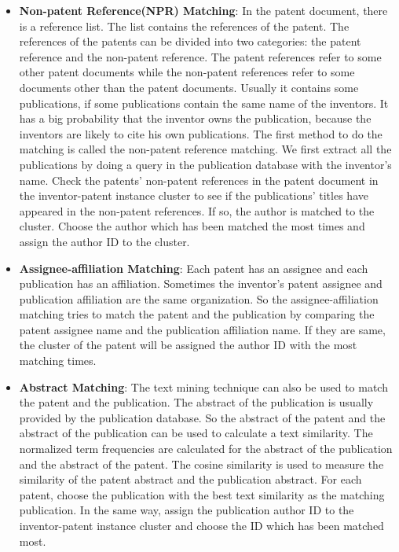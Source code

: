 \begin{itemize}

\item \textbf{Non-patent Reference(NPR) Matching}:
In the patent document, there is a reference list. The list contains the references of the patent. The references of the patents can be divided into two categories: the patent reference and the non-patent reference. The patent references refer to some other patent documents while the non-patent references refer to some documents other than the patent documents. Usually it contains some publications, if some publications contain the same name of the inventors. It has a big probability that the inventor owns the publication, because the inventors are likely to cite his own publications. The first method to do the matching is called the non-patent reference matching. We first extract all the publications by doing a query in the publication database with the inventor's name. Check the patents' non-patent references in the patent document in the inventor-patent instance cluster to see if the publications' titles have appeared in the non-patent references. If so, the author is matched to the cluster. Choose the author which has been matched the most times and assign the author ID to the cluster.

\item \textbf{Assignee-affiliation Matching}:
Each patent has an assignee and each publication has an affiliation. Sometimes the inventor's patent assignee and publication affiliation are the same organization. So the assignee-affiliation matching tries to match the patent and the publication by comparing the patent assignee name and the publication affiliation name. If they are  same, the cluster of the patent will be assigned the author ID with the most matching times.

\item \textbf{Abstract Matching}:
The text mining technique can also be used to match the patent and the publication. The abstract of the publication is usually provided by the publication database. So the abstract of the patent and the abstract of the publication can be used to calculate a text similarity. The normalized term frequencies are calculated for the abstract of the publication and the abstract of the patent. The cosine similarity is used to measure the similarity of the patent abstract and the publication abstract. For each patent, choose the publication with the best text similarity as the matching publication. In the same way, assign the publication author ID to the inventor-patent instance cluster and choose the ID which has been matched most. 
 
\end{itemize}

